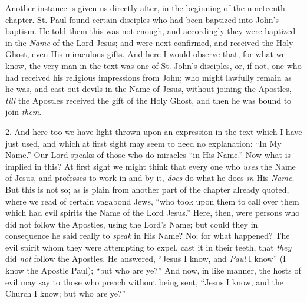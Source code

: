 Another instance is given us directly after, in the beginning of
the nineteenth chapter. St. Paul found certain disciples who had been
baptized into John's baptism. He told them this was not enough, and
accordingly they were baptized in the \emph{Name} of the Lord Jesus;
and were next confirmed, and received the Holy Ghost, even His
miraculous gifts. And here I would observe that, for what we know, the
very man in the text was one of St. John's disciples, or, if not, one
who had received his religious impressions from John; who might
lawfully remain as he was, and cast out devils in the Name of Jesus,
without joining the Apostles, \emph{till} the Apostles received the
gift of the Holy Ghost, and then he was bound to join \emph{them}.

2. And here too we have light thrown upon an expression in the text
which I have just used, and which at first sight may seem to need no
explanation: ``In My Name.'' Our Lord speaks of those who do
miracles ``in His Name.'' Now what is implied in this? At
first sight we might think that every one who \emph{uses} the Name of
Jesus, and professes to work in and by it, \emph{does} do what he does
\emph{in} His \emph{Name}. But this is not so; as is plain from
another part of the chapter already quoted, where we read of certain
vagabond Jews, ``who took upon them to call over them which had
evil spirits the Name of the Lord Jesus.'' Here, then, were
persons who did not follow the Apostles, using the Lord's Name; but
could they in consequence he said really to \emph{speak} in His Name?
No; for what happened? The evil spirit whom they were attempting to
expel, cast it in their teeth, that \emph{they} did \emph{not} follow
the Apostles. He answered, ``Jesus I know, and \emph{Paul} I
know'' (I know the Apostle Paul); ``but who are ye?'' And
now, in like manner, the hosts of evil may say to those who preach
without being sent, ``Jesus I know, and the Church I know; but who
are ye?''

